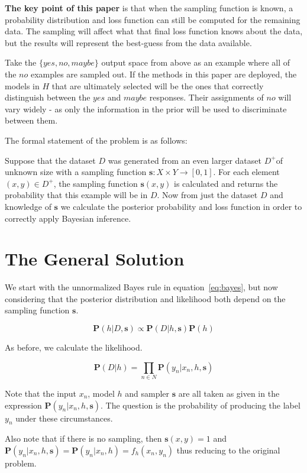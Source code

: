 \documentclass[twoside]{article}
\begin{document}
\textbf{The key point of this paper} is that when the sampling function is known, a probability distribution and loss function can still be computed for the remaining data. The sampling will affect what that final loss function knows about the data, but the results will represent the best-guess from the data available.

Take the \(\{yes, no, maybe\}\) output space from above as an example where all of the \(no\) examples are sampled out. If the methods in this paper are deployed, the models in \(H\) that are ultimately selected will be the ones that correctly distinguish between the \(yes\) and \(maybe\) responses. Their assignments of \(no\) will vary widely - as only the information in the prior will be used to discriminate between them.

The formal statement of the problem is as follows:

Suppose that the dataset \(D\) was generated from an even larger dataset \(D^+\)of unknown size with a sampling function \(\mathbf{s}: X \times Y \rightarrow \left [ 0,1\right ]\). For each element \((x,y)\in D^+\), the sampling function \(\mathbf{s}(x,y)\) is calculated and returns the probability that this example will be in \(D\). Now from just the dataset \(D\) and knowledge of \(\mathbf{s}\) we calculate the posterior probability and loss function in order to correctly apply Bayesian inference.

\section{The General Solution}

We start with the unnormalized Bayes rule in equation~\eqref{eq:bayes}, but now considering that the posterior distribution and likelihood both depend on the sampling function \(\mathbf{s}\).

\[\mathbf{P}(h|D,\mathbf{s})\propto\mathbf{P}(D|h,\mathbf{s})\mathbf{P}(h)\]

As before, we calculate the likelihood.

\[\mathbf{P}(D|h)=\prod_{n \in N} \mathbf{P}(y_n|x_n,h,\mathbf{s})\]

Note that the input \(x_n\), model \(h\) and sampler \(\mathbf{s}\) are all taken as given in the expression \(\mathbf{P}(y_n|x_n,h,\mathbf{s})\). The question is the probability of producing the label \(y_n\) under these circumstances.

Also note that if there is no sampling, then \(\mathbf{s}(x,y)=1\) and \(\mathbf{P}(y_n|x_n,h,\mathbf{s}) = \mathbf{P}(y_n|x_n,h)=f_h(x_n,y_n)\) thus reducing to the original problem.
\end{document}
